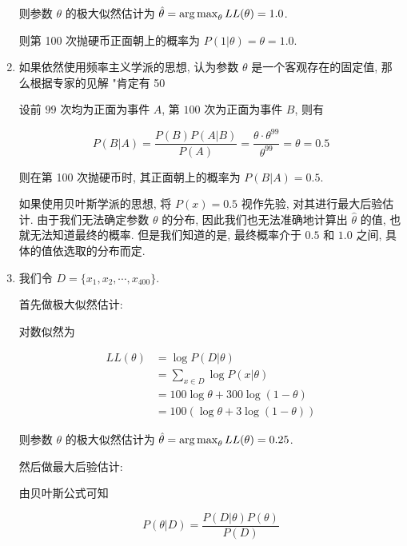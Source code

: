 \documentclass[answers]{exam}  %
\begin{document}
\begin{questions}
\begin{solution}
\begin{enumerate}
            则参数 $\theta$ 的极大似然估计为 $\displaystyle \hat{\theta} = \operatorname{arg\,max}_{\theta} LL(\theta) = 1.0$.

            则第 100 次抛硬币正面朝上的概率为 $P(1|\theta) = \theta = 1.0$.

      \item

            如果依然使用频率主义学派的思想, 认为参数 $\theta$ 是一个客观存在的固定值, 那么根据专家的见解 "肯定有 50%

            设前 $99$ 次均为正面为事件 $A$, 第 $100$ 次为正面为事件 $B$, 则有

            $$
              P(B|A) = \frac{P(B)P(A|B)}{P(A)} = \frac{\theta \cdot \theta^{99}}{\theta^{99}} = \theta = 0.5
            $$

            则在第 100 次抛硬币时, 其正面朝上的概率为 $P(B|A) = 0.5$.

            如果使用贝叶斯学派的思想, 将 $P(x)=0.5$ 视作先验, 对其进行最大后验估计. 由于我们无法确定参数 $\theta$ 的分布, 因此我们也无法准确地计算出 $\hat{\theta}$ 的值, 也就无法知道最终的概率. 但是我们知道的是, 最终概率介于 $0.5$ 和 $1.0$ 之间, 具体的值依选取的分布而定.


      \item

            我们令 $D = \{ x_1, x_2, \cdots, x_{400} \}$.

            首先做极大似然估计:

            对数似然为

            $$
              \begin{aligned}
                LL(\theta) & = \log P(D | \theta)                  \\
                           & = \sum_{x \in D} \log P(x|\theta)     \\
                           & = 100\log \theta + 300\log (1-\theta) \\
                           & = 100(\log \theta + 3 \log(1-\theta))
              \end{aligned}
            $$

            则参数 $\theta$ 的极大似然估计为 $\displaystyle \hat{\theta} = \operatorname{arg\,max}_{\theta} LL(\theta) = 0.25$.

            然后做最大后验估计:

            由贝叶斯公式可知

            $$
              P(\theta|D) = \frac{P(D|\theta)P(\theta)}{P(D)}
            $$


\end{enumerate}
\end{solution}
\end{questions}
\end{document}
